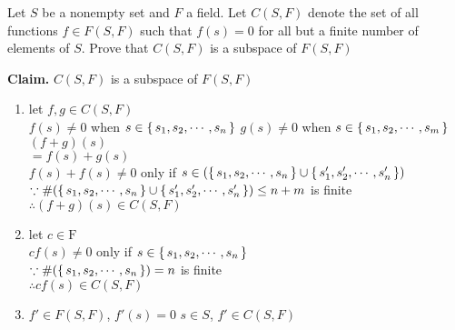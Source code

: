 Let $S$ be a nonempty set and $F$ a field. Let $C(S,F)$ denote the set of all functions $f \in F(S,F)$ such that $f(s) = 0$ for all but a finite number of elements of $S$. Prove that $C(S,F)$ is a subspace of $F(S,F)$

\begin{tcolorbox}
	\begin{solution}
		\textbf{Claim.} $C(S,F)$ is a subspace of $F(S,F)$
		
		\begin{enumerate}
			\item let $f,g \in C(S,F)$\\
			$f(s) \neq 0$ when $s \in \left\{ \,s_1,s_2,\cdots,s_n \,\right\}$
			$g(s) \neq 0$ when $s \in \left\{ \,s_1,s_2,\cdots,s_m \,\right\}$
			$(f+g)(s)$\\
			$=f(s)+g(s)$\\
			$f(s)+f(s) \neq 0$ only if $s \in (\left\{ \,s_1,s_2,\cdots,s_n \,\right\}\cup\left\{ \,s'_1,s'_2,\cdots,s'_n \,\right\})$\\
			$\because \#(\left\{ \,s_1,s_2,\cdots,s_n \,\right\}\cup\left\{ \,s'_1,s'_2,\cdots,s'_n \,\right\}) \leq n+m$ is finite\\
			$\therefore (f+g)(s) \in C(S,F)$
			\item let $c \in \mathrm{F}$\\
			$cf(s) \neq 0$ only if $s \in \left\{ \,s_1,s_2,\cdots,s_n \,\right\}$\\
			$\because \#(\left\{ \,s_1,s_2,\cdots,s_n \,\right\}) = n$ is finite\\
			$\therefore cf(s) \in C(S,F)$
			\item $f' \in F(S,F)$,
			$f'(s) = 0 \,\, s\in S$,
			$f' \in C(S,F)$
		\end{enumerate}
	\end{solution}	
\end{tcolorbox}